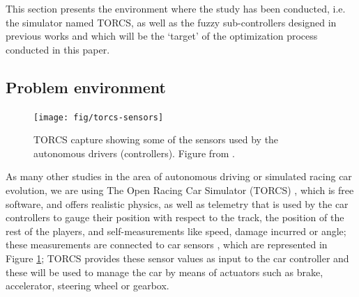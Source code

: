 \documentclass[10pt,journal,compsoc]{IEEEtran}
\begin{document}
This section presents the environment where the study has been conducted, i.e. the simulator named TORCS, as well as the fuzzy sub-controllers designed in previous works and which will be the `target' of the optimization process conducted in this paper.

%
\subsection{Problem environment}

\begin{figure}[!ht] 
	\begin{center}
		\texttt{[image: fig/torcs-sensors]}
		\caption {TORCS capture showing some of the sensors
                used by the autonomous drivers (controllers). Figure from \cite{DBLP:conf/cig/SalemMG19}.}
		\label{fig:torcs-sensors}
	\end{center}
\end{figure}

As many other studies in the area of autonomous driving or simulated
racing car evolution, we are using The Open Racing Car Simulator
(TORCS) \cite{torcs4}, which is free software, and offers realistic
physics, as well as telemetry that is used by the car controllers to
gauge their position with respect to the track, the position of the
rest of the players, and self-measurements like speed, damage incurred
or angle; these measurements are connected to car sensors \cite{manualTORCS}, which are represented in Figure \ref{fig:torcs-sensors}; TORCS provides
these sensor values as input to the car controller and these will be used to manage the car by means of actuators such as brake, accelerator, steering wheel or gearbox. 

\end{document}
